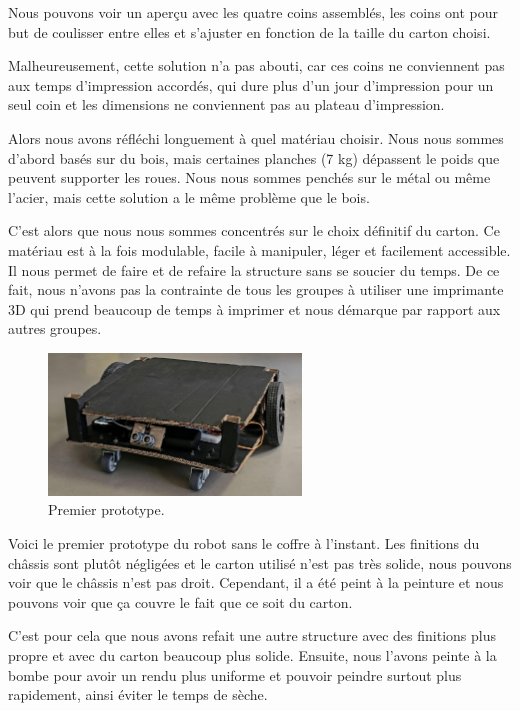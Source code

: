 \documentclass[a4paper,12pt]{report}  %
\begin{document}
Nous pouvons voir un aperçu avec les quatre coins assemblés, les coins ont pour but de coulisser entre elles et s’ajuster en fonction de la taille du carton choisi.

Malheureusement, cette solution n’a pas abouti, car ces coins ne conviennent pas aux temps d’impression accordés, qui dure plus d’un jour d’impression pour un seul coin et les dimensions ne conviennent pas au plateau d’impression.

Alors nous avons réfléchi longuement à quel matériau choisir. Nous nous sommes d’abord basés sur du bois, mais certaines planches (7 kg) dépassent le poids que peuvent supporter les roues. Nous nous sommes penchés sur le métal ou même l’acier, mais cette solution a le même problème que le bois. 

C’est alors que nous nous sommes concentrés sur le choix définitif du carton. Ce matériau est à la fois modulable, facile à manipuler, léger et facilement accessible. Il nous permet de faire et de refaire la structure sans se soucier du temps. De ce fait, nous n’avons pas la contrainte de tous les groupes à utiliser une imprimante 3D qui prend beaucoup de temps à imprimer et nous démarque par rapport aux autres groupes.

\begin{figure}[H]
	\centering
	\includegraphics[width=0.6\textwidth]{./attachments/prototype_1.jpg}
	\caption{Premier prototype.}
\end{figure}


Voici le premier prototype du robot sans le coffre à l’instant. Les finitions du châssis sont plutôt négligées et le carton utilisé n’est pas très solide, nous pouvons voir que le châssis n’est pas droit. Cependant, il a été peint à la peinture et nous pouvons voir que ça couvre le fait que ce soit du carton. 

C’est pour cela que nous avons refait une autre structure avec des finitions plus propre et avec du carton beaucoup plus solide. Ensuite, nous l’avons peinte à la bombe pour avoir un rendu plus uniforme et pouvoir peindre surtout plus rapidement, ainsi éviter le temps de sèche. 
\end{document}
